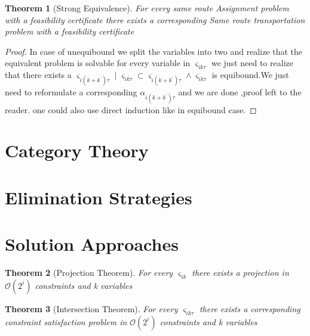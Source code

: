 \documentclass[a4paper]{article}
\newtheorem{theorem}{Theorem}
\begin{document}
    \begin{theorem}[Strong Equivalence] \label{thm:se}
    For every same route Assignment problem with a feasibility certificate there exists a corresponding Same route transportation problem with a feasibility certificate 
    \end{theorem}
    \begin{proof}
    In case of unequibound we split the variables into two and realize that the equivalent problem is solvable for every variable in $\varsigma_{ik\tau}$ we just need to realize that there exists a $\varsigma_{i(k+k^\prime)\tau} \mid \varsigma_{ik\tau} \subset \varsigma_{i(k+k^\prime)\tau} \wedge \varsigma_{ik\tau}$ is equibound.We just need to reformulate a corresponding $\alpha_{i(k+k^\prime)\tau}$ and we are done ,proof left to the reader. one could also use direct induction like in equibound case.
    \end{proof}
    
    \section{Category Theory}
    
    
    \section{Elimination Strategies}
    
    \section{Solution Approaches}

    
    \begin{theorem}[Projection Theorem] \label{thm:pt}
    For every $\varsigma_{ik}$  there exists a projection in $\mathcal{O}({2^i})$ constraints and k variables 
    \end{theorem}

    \begin{theorem}[Intersection Theorem] \label{thm:it}
    For every $\varsigma_{ik\tau}$  there exists a corresponding constraint satisfaction problem in $\mathcal{O}({2^i})$ constraints and k variables 
    \end{theorem}
    
    
    
    
    
\end{document}
